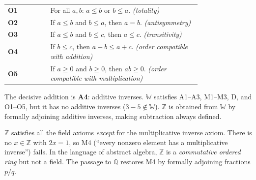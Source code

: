 \begin{tcolorbox}
\medskip
\begin{tabular}{@{} l p{0.78\linewidth} @{}}
\textbf{O1} & For all $a, b$: $a \leq b$ or $b \leq a$.
             \hfill\textit{(totality)} \\[4pt]
\textbf{O2} & If $a \leq b$ and $b \leq a$, then $a = b$.
             \hfill\textit{(antisymmetry)} \\[4pt]
\textbf{O3} & If $a \leq b$ and $b \leq c$, then $a \leq c$.
             \hfill\textit{(transitivity)} \\[4pt]
\textbf{O4} & If $b \leq c$, then $a + b \leq a + c$.
             \hfill\textit{(order compatible with addition)} \\[4pt]
\textbf{O5} & If $a \geq 0$ and $b \geq 0$, then $ab \geq 0$.
             \hfill\textit{(order compatible with multiplication)} \\[4pt]
\end{tabular}

\end{tcolorbox}

\begin{remark}
The decisive addition is \textbf{A4}: additive inverses.
$\mathbb{W}$ satisfies A1--A3, M1--M3, D, and O1--O5,
but it has no additive inverses ($3 - 5 \notin \mathbb{W}$).
$\mathbb{Z}$ is obtained from $\mathbb{W}$ by formally adjoining
additive inverses, making subtraction always defined.
\end{remark}

\begin{remark}
$\mathbb{Z}$ satisfies all the field axioms \emph{except} for
the multiplicative inverse axiom.
There is no $x \in \mathbb{Z}$ with $2x = 1$, so M4
(``every nonzero element has a multiplicative inverse'') fails.
In the language of abstract algebra, $\mathbb{Z}$ is a
\emph{commutative ordered ring} but not a field.
The passage to $\mathbb{Q}$ restores M4 by formally adjoining
fractions $p/q$.
\end{remark}

\medskip


